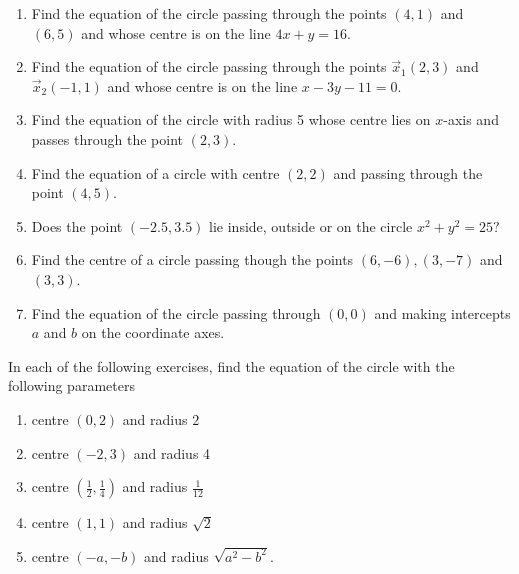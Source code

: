 \begin{enumerate}[label=\thesubsection.\arabic*,ref=\thesubsection.\theenumi]
  \item Find the equation of the circle passing through the points $(4,1)$ and $(6,5)$ and whose centre is on the line $ 4x+y=16. $
\label{chapters/11/11/1/10}
\\
\solution

  \item Find the equation of the circle passing through the points $\vec{x}_1(2,3)$ and $\vec{x}_2(-1,1)$ and whose centre is on the line $x-3y-11=0$.
\label{chapters/11/11/1/11}
\\
\solution 

  \item Find the equation of the circle with radius 5 whose centre lies on $x$-axis and passes through the point $(2,3)$.
\label{chapters/11/11/1/12}
\\
\solution 

  \item Find the equation of a circle with centre $(2,2)$ and passing through the point $(4,5)$.
\label{chapters/11/11/1/14}
\\
\solution

  \item Does the point $(-2.5,3.5)$ lie inside, outside or on the circle $x^{2}+y^{2}=25?$
\\
\solution

\item Find the centre of a circle passing though the points $(6,-6), (3,-7)$ and $(3,3)$. \\ 
\label{chapters/10/7/4/3}
\solution 

  \item Find the equation of the circle passing through $(0,0)$ and making intercepts $a$ and $b$ on the coordinate axes.
\end{enumerate}
In each of the following exercises, find the equation of the circle with the following parameters
\begin{enumerate}[label=\thesubsection.\arabic*,ref=\thesubsection.\theenumi,resume*]
 \item centre $(0,2)$ and radius $2$
	 \\
		\solution
\label{chapters/11/11/1/1}

%
  \item centre $(-2,3)$ and radius 4
	 \\
		\solution
\label{chapters/11/11/1/2}


  \item centre $\left(\frac{1}{2}, \frac{1}{4}\right)$ and radius $\frac{1}{12}$
\label{chapters/11/11/1/3}
	 \\
		\solution

  \item centre $(1,1)$ and radius $\sqrt{2}$
	 \\
		\solution


  \item centre $(-a,-b)$ and radius $\sqrt{a^{2}-b^{2}}$.
	 \\
		\solution
\label{chapters/11/11/1/5}
%
\end{enumerate}

